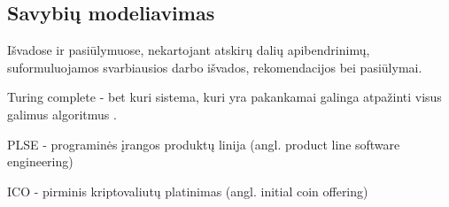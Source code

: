 \documentclass{VUMIFPSkursinis}
\begin{document}
\subsection{Savybių modeliavimas}





Išvadose ir pasiūlymuose, nekartojant atskirų dalių apibendrinimų,
suformuluojamos svarbiausios darbo išvados, rekomendacijos bei pasiūlymai.



\printbibliography[heading=bibintoc] %

Turing complete - bet kuri sistema, kuri yra pakankamai galinga atpažinti visus galimus algoritmus \cite{Teller1994}. 

PLSE - programinės įrangos produktų linija (angl. product line software engineering)

ICO - pirminis kriptovaliutų platinimas (angl. initial coin offering)

%
\end{document}
